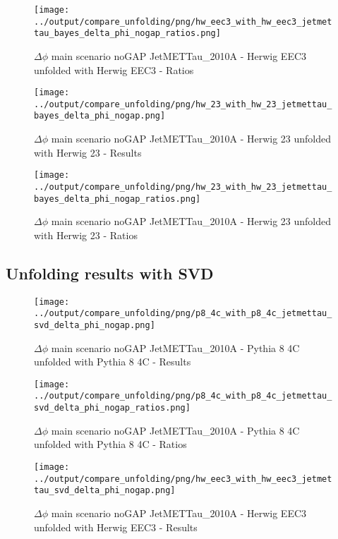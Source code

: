 \documentclass[11pt]{book}
\begin{document}
\begin{figure}[ht]
\centering
\texttt{[image: ../output/compare\_unfolding/png/hw\_eec3\_with\_hw\_eec3\_jetmettau\_bayes\_delta\_phi\_nogap\_ratios.png]}
\caption{$\Delta\phi$ main scenario noGAP JetMETTau\_2010A - Herwig EEC3 unfolded with Herwig EEC3 - Ratios}
\label{hw_eec3_hw_eec3_jetmettau_bayes_delta_phi_nogap_b}
\end{figure}

\begin{figure}[ht]
\centering
\texttt{[image: ../output/compare\_unfolding/png/hw\_23\_with\_hw\_23\_jetmettau\_bayes\_delta\_phi\_nogap.png]}
\caption{$\Delta\phi$ main scenario noGAP JetMETTau\_2010A - Herwig 23 unfolded with Herwig 23 - Results}
\label{hw_23_hw_23_jetmettau_bayes_delta_phi_nogap_a}
\end{figure}

\begin{figure}[ht]
\centering
\texttt{[image: ../output/compare\_unfolding/png/hw\_23\_with\_hw\_23\_jetmettau\_bayes\_delta\_phi\_nogap\_ratios.png]}
\caption{$\Delta\phi$ main scenario noGAP JetMETTau\_2010A - Herwig 23 unfolded with Herwig 23 - Ratios}
\label{hw_23_hw_23_jetmettau_bayes_delta_phi_nogap_b}
\end{figure}


\clearpage
\subsection{Unfolding results with SVD}

\begin{figure}[ht]
\centering
\texttt{[image: ../output/compare\_unfolding/png/p8\_4c\_with\_p8\_4c\_jetmettau\_svd\_delta\_phi\_nogap.png]}
\caption{$\Delta\phi$ main scenario noGAP JetMETTau\_2010A - Pythia 8 4C unfolded with Pythia 8 4C - Results}
\label{p8_p8_jetmettau_svd_delta_phi_nogap_a}
\end{figure}

\begin{figure}[ht]
\centering
\texttt{[image: ../output/compare\_unfolding/png/p8\_4c\_with\_p8\_4c\_jetmettau\_svd\_delta\_phi\_nogap\_ratios.png]}
\caption{$\Delta\phi$ main scenario noGAP JetMETTau\_2010A - Pythia 8 4C unfolded with Pythia 8 4C - Ratios}
\label{p8_p8_jetmettau_svd_delta_phi_nogap_b}
\end{figure}

\begin{figure}[ht]
\centering
\texttt{[image: ../output/compare\_unfolding/png/hw\_eec3\_with\_hw\_eec3\_jetmettau\_svd\_delta\_phi\_nogap.png]}
\caption{$\Delta\phi$ main scenario noGAP JetMETTau\_2010A - Herwig EEC3 unfolded with Herwig EEC3 - Results}
\label{hw_eec3_hw_eec3_jetmettau_svd_delta_phi_nogap_a}
\end{figure}
\end{document}
